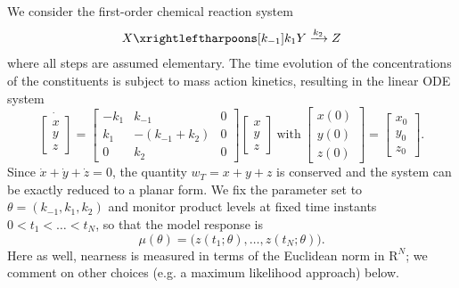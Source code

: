 \documentclass{article}
\newcommand{\p}{\theta}
\newcommand{\omr}{\mu}
\newcommand{\R}{\mathrm{R}}
\newcommand{\be}{\begin{equation}}
\newcommand{\ee}{\end{equation}}
\begin{document}
We consider the first-order chemical reaction system
%
\begin{align*}
  X \xrightleftharpoons[k_{-1}]{k_1} Y \xrightarrow[]{k_2} Z
\end{align*}
%
where all steps are assumed elementary.
The time evolution of the concentrations of the constituents is subject to mass action kinetics, resulting in the linear ODE system
%
\be
\dot{\left[\begin{array}{c}
 x \\ y \\ z
\end{array}\right]}
=
\left[\begin{array}{ccc}
 -k_1 & k_{-1} & 0 \\
 k_1 & -(k_{-1}+k_2) & 0 \\
 0 & k_2 & 0
\end{array}\right]
%
\left[\begin{array}{c}
 x \\ y \\ z
\end{array}\right]
%
\ \mbox{with} \
%
\left[\begin{array}{c}
 x(0) \\ y(0) \\ z(0)
\end{array}\right]
=
\left[\begin{array}{c}
 x_0 \\ y_0 \\ z_0
\end{array}\right] .
\label{xyz-ODE}
\ee
%
Since $\dot{x}+\dot{y}+\dot{z}=0$, the quantity $w_T = x+y+z$ is conserved and the system can be exactly reduced to a planar form.
We fix the parameter set to $\p = (k_{-1},k_1,k_2)$ and monitor product levels at fixed time instants $0 < t_1 < \ldots < t_N$, so that the model response is
%
\[
 \omr(\p)
=
 \big(z(t_1;\p) , \ldots , z(t_N;\p)\big) .
\]
%
Here as well, nearness is measured in terms of the Euclidean norm in $\R^N$; we
comment on other choices (e.g. a maximum likelihood approach) below.\\
\end{document}
